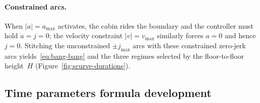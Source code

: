 \documentclass[manuscript,review,screen]{acmart}
\begin{document}
\paragraph{Constrained arcs.}
When $|a|\!=\!a_{\max}$ activates, the cabin rides the boundary and
the controller must hold $\dot a\!=\!j\!=\!0$; the velocity
constraint $|v|\!=\!v_{\max}$ similarly forces $a\!=\!0$ and hence
$j\!=\!0$.  Stitching the unconstrained $\pm j_{\max}$ arcs with
these constrained zero-jerk arcs yields~\eqref{eq:bang-bang} and
the three regimes selected by the floor-to-floor height~$H$
(Figure~\ref{fig:scurve-durations}).

\subsection{Time parameters formula development}
\label{app:time-params}
\end{document}
